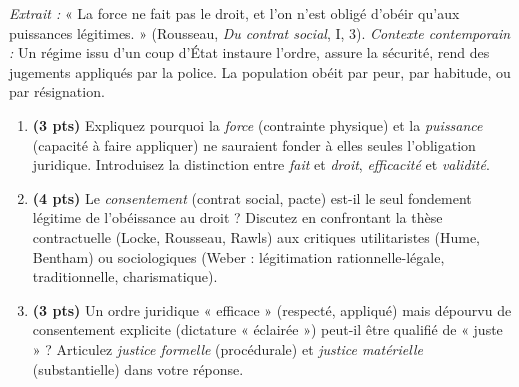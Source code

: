 \documentclass[11pt]{article}
\begin{document}
\begin{exercice}
\textit{Extrait :} « La force ne fait pas le droit, et l'on n'est obligé d'obéir qu'aux puissances légitimes. » (Rousseau, \textit{Du contrat social}, I, 3). \textit{Contexte contemporain :} Un régime issu d'un coup d'État instaure l'ordre, assure la sécurité, rend des jugements appliqués par la police. La population obéit par peur, par habitude, ou par résignation.
\begin{enumerate}
    \item \textbf{(3 pts)} Expliquez pourquoi la \textit{force} (contrainte physique) et la \textit{puissance} (capacité à faire appliquer) ne sauraient fonder à elles seules l'obligation juridique. Introduisez la distinction entre \textit{fait} et \textit{droit}, \textit{efficacité} et \textit{validité}.
    \item \textbf{(4 pts)} Le \textit{consentement} (contrat social, pacte) est-il le seul fondement légitime de l'obéissance au droit ? Discutez en confrontant la thèse contractuelle (Locke, Rousseau, Rawls) aux critiques utilitaristes (Hume, Bentham) ou sociologiques (Weber : légitimation rationnelle-légale, traditionnelle, charismatique).
    \item \textbf{(3 pts)} Un ordre juridique « efficace » (respecté, appliqué) mais dépourvu de consentement explicite (dictature « éclairée ») peut-il être qualifié de « juste » ? Articulez \textit{justice formelle} (procédurale) et \textit{justice matérielle} (substantielle) dans votre réponse.
\end{enumerate}
\end{exercice}
\end{document}
